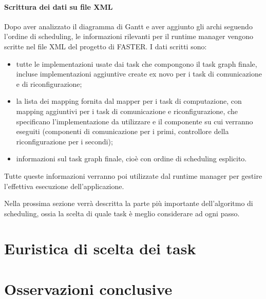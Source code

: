 \paragraph{Scrittura dei dati su file XML}
Dopo aver analizzato il diagramma di Gantt e aver aggiunto gli archi seguendo 
l'ordine di scheduling, le informazioni rilevanti per il runtime manager 
vengono scritte nel file XML del progetto di \ac{FASTER}. I dati scritti sono:
\begin{itemize}
 \item tutte le implementazioni usate dai task che compongono il task graph 
finale, incluse implementazioni aggiuntive create ex novo per i task di 
comunicazione e di riconfigurazione;
 \item la lista dei mapping fornita dal mapper per i task di computazione, con 
mapping aggiuntivi per i task di comunicazione e riconfigurazione, che 
specificano l'implementazione da utilizzare e il componente su cui verranno 
eseguiti (componenti di comunicazione per i primi, controllore della 
riconfigurazione per i secondi);
 \item informazioni sul task graph finale, cioè con ordine di scheduling 
esplicito.
\end{itemize}

Tutte queste informazioni verranno poi utilizzate dal runtime manager per 
gestire l'effettiva esecuzione dell'applicazione.

Nella prossima sezione verrà descritta la parte più importante dell'algoritmo 
di scheduling, ossia la scelta di quale task è meglio considerare ad ogni 
passo.


\section{Euristica di scelta dei task}
\label{sec:euristicaSceltaTask}


\section{Osservazioni conclusive}
\label{sec:osservazioniConclusive}
